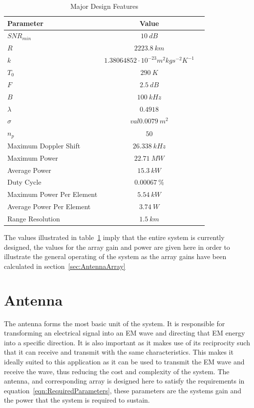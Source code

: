 \documentclass[11pt]{witseiepaper}
\begin{document}
\begin{bibunit}[witseie]
\begin{table}[htb]
    \caption{Major Design Features}
    \label{tab:DesignValues}
    \begin{center}
        \begin{tabular}{p{70mm}cp{70mm}}
            \hline 
            Parameter & Value \\
            \hline
            $SNR_{min}$ & $10~dB$ \\
            $R$ & $2223.8~km$ \\
            $k$ & $1.38064852 \cdot 10^{-23} m^2 kg s^{-2} K^{-1}$ \\
            $T_{0}$ & $290~K$ \\
            $F$ & $2.5~dB$ \\
            $B$ & $100~kHz$ \\
            $\lambda$ & $0.4918$ \\
            $\sigma$ & $val0.0079~m^2$ \\
            $n_p$ & $50$ \\
            Maximum Doppler Shift & $26.338~kHz$ \\
            Maximum Power & $22.71~MW$ \\
            Average Power & $15.3~kW$ \\
            Duty Cycle & $0.00067~\%$ \\
            Maximum Power Per Element & $5.54~kW$ \\
            Average Power Per Element & $3.74~W$ \\
            Range Resolution & $1.5~km$ \\
            \hline
        \end{tabular}
    \end{center}
\end{table}
The values illustrated in table~\ref{tab:DesignValues} imply that the entire system is currently designed, the values for the array gain and power are given here in order to illustrate the general operating of the system as the array gains have been calculated in section~\ref{sec:AntennaArray}
\section{Antenna} \label{sec:Antenna}
The antenna forms the most basic unit of the system. It is responsible for transforming an electrical signal into an EM wave and directing that EM energy into a specific direction. It is also important as it makes use of its reciprocity such that it can receive and transmit with the same characteristics. This makes it ideally suited to this application as it can be used to transmit the EM wave and receive the wave, thus reducing the cost and complexity of the system.
The antenna, and corresponding array is designed here to satisfy the requirements in equation~\ref{eqn:RequiredParameters}, these parameters are the systems gain and the power that the system is required to sustain.


\end{bibunit}
\end{document}
